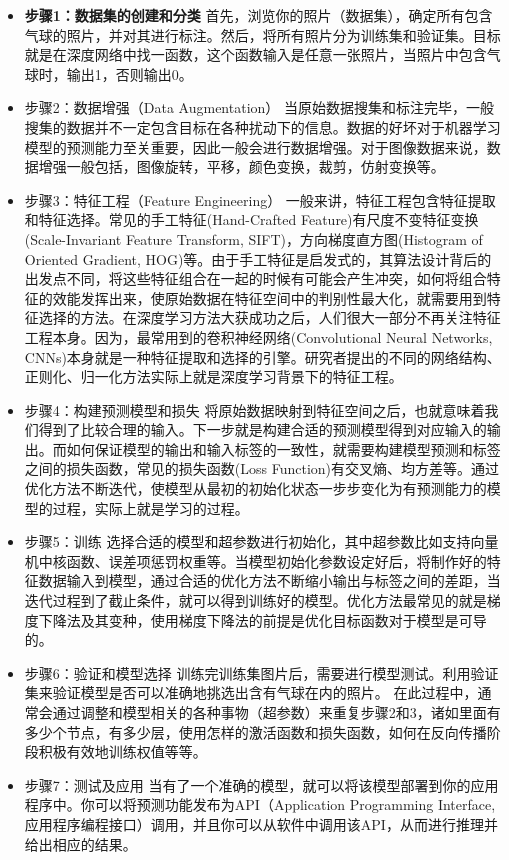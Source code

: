 \begin{itemize}
	\item {\bf 步骤1：数据集的创建和分类} 首先，浏览你的照片（数据集），确定所有包含气球的照片，并对其进行标注。然后，将所有照片分为训练集和验证集。目标就是在深度网络中找一函数，这个函数输入是任意一张照片，当照片中包含气球时，输出1，否则输出0。

\item 步骤2：数据增强（Data Augmentation）
	当原始数据搜集和标注完毕，一般搜集的数据并不一定包含目标在各种扰动下的信息。数据的好坏对于机器学习模型的预测能力至关重要，因此一般会进行数据增强。对于图像数据来说，数据增强一般包括，图像旋转，平移，颜色变换，裁剪，仿射变换等。

\item 步骤3：特征工程（Feature Engineering）
	一般来讲，特征工程包含特征提取和特征选择。常见的手工特征(Hand-Crafted Feature)有尺度不变特征变换(Scale-Invariant Feature Transform, SIFT)，方向梯度直方图(Histogram of Oriented Gradient, HOG)等。由于手工特征是启发式的，其算法设计背后的出发点不同，将这些特征组合在一起的时候有可能会产生冲突，如何将组合特征的效能发挥出来，使原始数据在特征空间中的判别性最大化，就需要用到特征选择的方法。在深度学习方法大获成功之后，人们很大一部分不再关注特征工程本身。因为，最常用到的卷积神经网络(Convolutional Neural Networks, CNNs)本身就是一种特征提取和选择的引擎。研究者提出的不同的网络结构、正则化、归一化方法实际上就是深度学习背景下的特征工程。

\item 步骤4：构建预测模型和损失
	将原始数据映射到特征空间之后，也就意味着我们得到了比较合理的输入。下一步就是构建合适的预测模型得到对应输入的输出。而如何保证模型的输出和输入标签的一致性，就需要构建模型预测和标签之间的损失函数，常见的损失函数(Loss Function)有交叉熵、均方差等。通过优化方法不断迭代，使模型从最初的初始化状态一步步变化为有预测能力的模型的过程，实际上就是学习的过程。

\item 步骤5：训练
	选择合适的模型和超参数进行初始化，其中超参数比如支持向量机中核函数、误差项惩罚权重等。当模型初始化参数设定好后，将制作好的特征数据输入到模型，通过合适的优化方法不断缩小输出与标签之间的差距，当迭代过程到了截止条件，就可以得到训练好的模型。优化方法最常见的就是梯度下降法及其变种，使用梯度下降法的前提是优化目标函数对于模型是可导的。

\item 步骤6：验证和模型选择
	训练完训练集图片后，需要进行模型测试。利用验证集来验证模型是否可以准确地挑选出含有气球在内的照片。
	在此过程中，通常会通过调整和模型相关的各种事物（超参数）来重复步骤2和3，诸如里面有多少个节点，有多少层，使用怎样的激活函数和损失函数，如何在反向传播阶段积极有效地训练权值等等。

\item 步骤7：测试及应用
	当有了一个准确的模型，就可以将该模型部署到你的应用程序中。你可以将预测功能发布为API（Application Programming Interface, 应用程序编程接口）调用，并且你可以从软件中调用该API，从而进行推理并给出相应的结果。
	\end{itemize}

